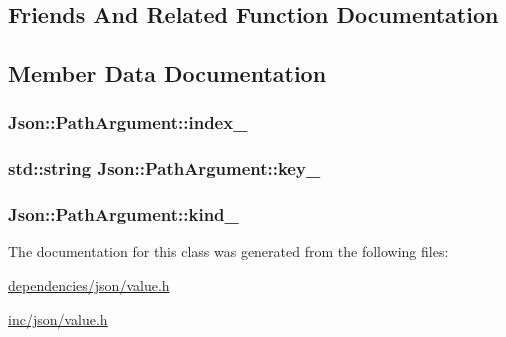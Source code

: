 \subsection{Friends And Related Function Documentation}
\hypertarget{classJson_1_1PathArgument_a51971c24df68e5ad775ed4f8c33e968f}{
\subsubsection[{Path}]{\hspace{0.3cm}{\ttfamily [friend]}}}\label{dc/d2f/classJson_1_1PathArgument_a51971c24df68e5ad775ed4f8c33e968f}


\subsection{Member Data Documentation}
\hypertarget{classJson_1_1PathArgument_a22cec332c6d6c9a7ffae886020fff45d}{
\subsubsection[{index\-\_\-}]{ Json\-::\-Path\-Argument\-::index\-\_\-\hspace{0.3cm}{\ttfamily [private]}}}\label{dc/d2f/classJson_1_1PathArgument_a22cec332c6d6c9a7ffae886020fff45d}
\hypertarget{classJson_1_1PathArgument_a5d901b404323b61f066fb1adb3babfe1}{
\subsubsection[{key\-\_\-}]{\setlength{\rightskip}{0pt plus 5cm}std\-::string Json\-::\-Path\-Argument\-::key\-\_\-\hspace{0.3cm}{\ttfamily [private]}}}\label{dc/d2f/classJson_1_1PathArgument_a5d901b404323b61f066fb1adb3babfe1}
\hypertarget{classJson_1_1PathArgument_ad4bc4b544b155a3d9c7788572ecf991b}{
\subsubsection[{kind\-\_\-}]{ Json\-::\-Path\-Argument\-::kind\-\_\-\hspace{0.3cm}{\ttfamily [private]}}}\label{dc/d2f/classJson_1_1PathArgument_ad4bc4b544b155a3d9c7788572ecf991b}


The documentation for this class was generated from the following files\-:\begin{DoxyCompactItemize}
\item 
\hyperlink{dependencies_2json_2value_8h}{dependencies/json/value.\-h}\item 
\hyperlink{inc_2json_2value_8h}{inc/json/value.\-h}\end{DoxyCompactItemize}
